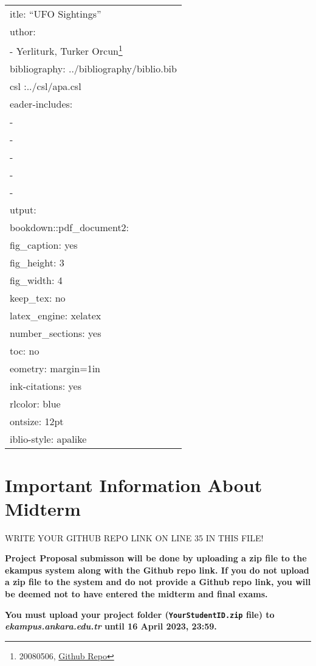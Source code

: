 \documentclass[
]{article}
\author{}
\date{\vspace{-2.5em}}
\begin{document}
{
\setcounter{tocdepth}{2}
\tableofcontents
}
\begin{longtable}[]{@{}l@{}}
\toprule()
\endhead
itle: ``UFO Sightings'' \\
uthor: \\
- Yerliturk, Turker Orcun\footnote{20080506, \href{https://github.com/orcunyerliturk/midterm}{Github Repo}} \\
bibliography: ../bibliography/biblio.bib \\
csl :../csl/apa.csl \\
eader-includes: \\
- \\
- \\
- \\
- \\
- \captionsetup[table]{skip=10pt} \\
utput: \\
bookdown::pdf\_document2: \\
fig\_caption: yes \\
fig\_height: 3 \\
fig\_width: 4 \\
keep\_tex: no \\
latex\_engine: xelatex \\
number\_sections: yes \\
toc: no \\
eometry: margin=1in \\
ink-citations: yes \\
rlcolor: blue \\
ontsize: 12pt \\
iblio-style: apalike \\
\bottomrule()
\end{longtable}

\hypertarget{important-information-about-midterm}{%
\section{Important Information About Midterm}\label{important-information-about-midterm}}

\colorbox{BurntOrange}{WRITE YOUR GITHUB REPO LINK ON LINE 35 IN THIS FILE!}

\textbf{Project Proposal submisson will be done by uploading a zip file to the ekampus system along with the Github repo link. If you do not upload a zip file to the system and do not provide a Github repo link, you will be deemed not to have entered the midterm and final exams.}

\textbf{You must upload your project folder (\texttt{YourStudentID.zip} file) to \emph{ekampus.ankara.edu.tr} until 16 April 2023, 23:59.}
\end{document}
